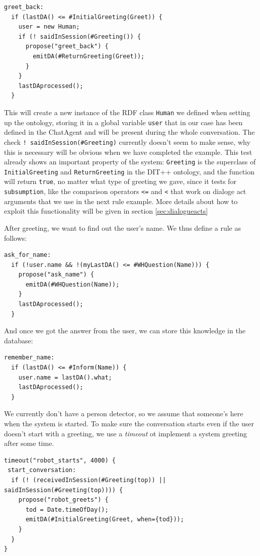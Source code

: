 \begin{lstlisting}
greet_back:
  if (lastDA() <= #InitialGreeting(Greet)) {
    user = new Human;
    if (! saidInSession(#Greeting()) {
      propose("greet_back") {
        emitDA(#ReturnGreeting(Greet));
      }
    }
    lastDAprocessed();
  }
\end{lstlisting}

This will create a new instance of the RDF class \texttt{Human} we defined when
setting up the ontology, storing it in a global variable \texttt{user} that in
our case has been defined in the ChatAgent and will be present during the whole
conversation. The check \texttt{!~saidInSession(\#Greeting)} currently doesn't
seem to make sense, why this is necessary will be obvious when we have
completed the example. This test already shows an important property of the
system: \texttt{Greeting} is the superclass of \texttt{InitialGreeting} and
\texttt{ReturnGreeting} in the DIT++ ontology, and the function will return
\texttt{true}, no matter what type of greeting we gave, since it tests for
\texttt{subsumption}, like the comparison operators \texttt{<=} and \texttt{<}
that work on dialoge act arguments that we use in the next rule example. More
details about how to exploit this functionality will be given in section
\ref{sec:dialogueacts}

After greeting, we want to find out the user's name. We thus define a rule as
follows:

\begin{lstlisting}
ask_for_name:
  if (!user.name && !(myLastDA() <= #WHQuestion(Name))) {
    propose("ask_name") {
      emitDA(#WHQuestion(Name));
    }
    lastDAprocessed();
  }
\end{lstlisting}

And once we got the answer from the user, we can store this knowledge in the
database:

\begin{lstlisting}
remember_name:
  if (lastDA() <= #Inform(Name)) {
    user.name = lastDA().what;
    lastDAprocessed();
  }
\end{lstlisting}

We currently don't have a person detector, so we assume that someone's here
when the system is started. To make sure the conversation starts even if the
user doesn't start with a greeting, we use a \emph{timeout} ot implement a
system greeting after some time.

\begin{lstlisting}
timeout("robot_starts", 4000) {
 start_conversation:
  if (! (receivedInSession(#Greeting(top)) || saidInSession(#Greeting(top)))) {
    propose("robot_greets") {
      tod = Date.timeOfDay();
      emitDA(#InitialGreeting(Greet, when={tod}));
    }
  }
}
\end{lstlisting}

